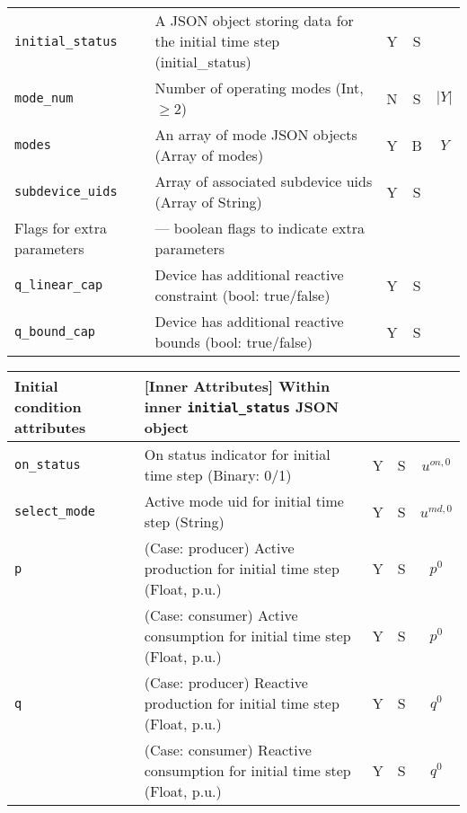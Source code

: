 \documentclass{article}
\begin{document}
\begin{center}
\begin{tabular}{ l | l | c | c | c |}
  {\tt initial\_status} & A JSON object storing data for the initial time step (initial\_status) & Y & S &  \\
  {\tt mode\_num} & Number of operating modes (Int, $\geq 2$) & N & S & $\lvert Y \rvert$ \\
{\tt modes} & An array of mode JSON objects (Array of modes) & Y & B & $Y$ \\
  {\tt subdevice\_uids} & Array of associated subdevice uids (Array of String) & Y & S & \\
  \hline
  Flags for extra parameters &  --- boolean flags to indicate extra parameters  &  &  & \\
  \hline
  {\tt q\_linear\_cap}      & Device has additional reactive constraint (bool: true/false) & Y & S & \\
  {\tt q\_bound\_cap}       & Device has additional reactive bounds (bool: true/false) & Y & S & \\
  \hline
  \end{tabular}
\end{center}  

\begin{center}
\small
\begin{tabular}{ l | l | c | c | c |}
  \hline
  Initial condition attributes & [Inner Attributes] Within inner {\tt initial\_status} JSON object &  &  & \\
  \hline    
  {\tt on\_status} & On status indicator for initial time step (Binary: 0/1) & Y & S & $u^{on,0}$\\
  {\tt select\_mode}  & Active mode uid for initial time step (String) & Y & S & $u^{md,0}$\\
  {\tt p} & { (Case: producer) Active production for initial time step (Float, p.u.) }& Y & S & $p^0$ \\
          & { (Case: consumer) Active consumption for initial time step (Float, p.u.) }& Y & S & $p^0$ \\
  {\tt q} & { (Case: producer) Reactive production for initial time step (Float, p.u.) }& Y & S & $q^0$ \\
          & { (Case: consumer) Reactive consumption for initial time step (Float, p.u.) }& Y & S & $q^0$ \\
  \hline
  \end{tabular}
\end{center}
\end{document}
